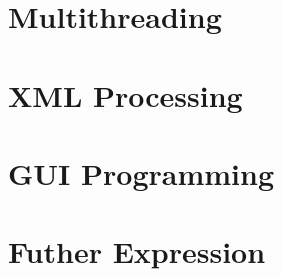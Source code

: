 \documentclass{wileySix}
\begin{document}
\chapter{Multithreading}


\chapter{XML Processing}


\chapter{GUI Programming}


\chapter{Futher Expression}










\printindex


\end{document}
